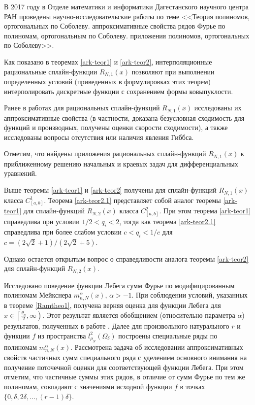 \Conclusion

В 2017 году в Отделе математики и информатики Дагестанского научного центра РАН проведены научно-исследовательские работы по теме
<<Теория полиномов, ортогональных по Соболеву. аппроксимативные свойства рядов Фурье по полиномам, ортогональным по Соболеву. приложения полиномов, ортогональных по Соболеву>>.





Как показано в теоремах \ref{ark-teor1} и \ref{ark-teor2}, интерполяционные рациональные
сплайн-функции $R_{N,1}(x)$ позволяют при выполнении определенных условий
(приведенных в формулировках этих теорем) интерполировать дискретные функции
с сохранением формы ковыпуклости.

Ранее в работах \cite{ark-12,ark-13,ark-14,ark-15} для рациональных
сплайн-функций $R_{N,1}(x)$ исследованы их аппроксимативные свойства
 (в частности, доказана безусловная сходимость для функций и производных, получены
 оценки скорости сходимости), а также исследованы вопросы отсутствия или наличия
явления Гиббса.

Отметим, что найдены приложения рациональных сплайн-функций $R_{N,1}(x)$ к  приближенному
решению начальных и краевых задач для дифференциальных уравнений.

Выше теоремы \ref{ark-teor1} и \ref{ark-teor2} получены для сплайн-функций $R_{N,1}(x)$ класса
$C^1_{[a,b]}$.
Теорема \ref{ark-teor2.1} представляет собой аналог теоремы \ref{ark-teor1} для сплайн-функций
$R_{N,2}(x)$ класса $C^2_{[a,b]}$. При этом теорема \ref{ark-teor1} справедлива
при условии $1/2<q_i<2$, тогда как теорема \ref{ark-teor2.1} справедлива при более
слабом условии $c<q_i<1/c$ для $c=(2\sqrt 2+1)/(2\sqrt 2+5)$.

Однако остается открытым вопрос о справедливости аналога теоремы  \ref{ark-teor2} для сплайн-функций
$R_{N,2}(x)$.

Исследовано поведение функции Лебега сумм Фурье по модифицированным полиномам Мейкснера $m_{n,N}^{\alpha}(x)$, $\alpha>-1$. При соблюдении условий, указанных в теореме \ref{Ramtheo1}, получена верняя оценка для функции Лебега для $x\in\left[\frac{\theta_n}{2}, \infty\right)$. Этот результат является обобщением (относительно параметра $\alpha$) результатов, полученных в работе \cite{Ram3}. Далее для произвольного натурального $r$  и функции $f$ из пространства $l_{\rho_N}^2(\Omega_\delta)$ построены специальные ряды по полиномам $m_{n,N}^{\alpha}(x)$. Рассмотрена задача об исследовании аппроксимативных свойств частичных сумм специального ряда с уделением основного внимания на получение поточечной оценки для соответствующей функции Лебега. При этом отметим, что частичные суммы этих рядов, в отличие от сумм Фурье по тем же полиномам, совпадают с значениями исходной функции $f$ в точках $\{0, \delta, 2\delta, \ldots, (r-1)\delta\}$.


